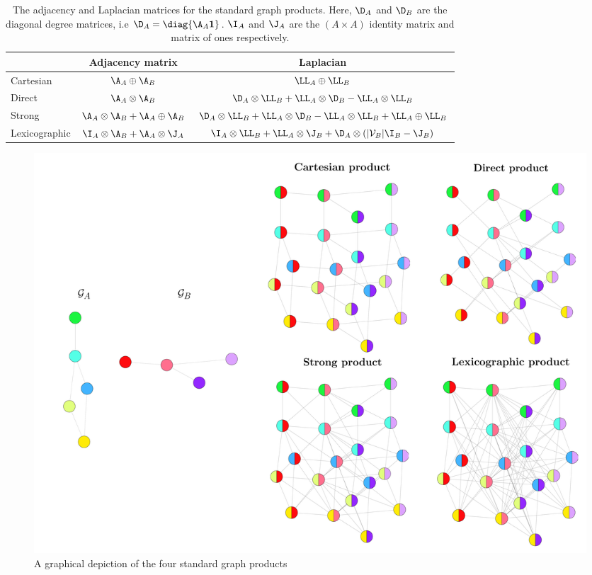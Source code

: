 \begin{table}[h]
\def\arraystretch{1.8}
\centering
\small
\vspace{0.5cm}
\begin{tabular}{|l|cc|}
    \hline 

    & Adjacency matrix
    & Laplacian \\

    \hline

    Cartesian 
    & $\A_A \oplus \A_B$ 
    & $\LL_A \oplus \LL_B$ \\

    Direct 
    & $\A_A \otimes \A_B$  
    & $\D_A \otimes \LL_B + \LL_A \otimes \D_B - \LL_A \otimes \LL_B$ \\
    
    Strong 
    & $\A_A \otimes \A_B + \A_A \oplus \A_B$ 
    & $\D_A \otimes \LL_B + \LL_A \otimes \D_B - \LL_A \otimes \LL_B + \LL_A \oplus \LL_B$ \\

    Lexicographic 
    & $\I_A \otimes \A_B + \A_A \otimes \J_A$ 
    &  $\I_A \otimes \LL_B + \LL_A \otimes \J_B + \D_A \otimes (|\mathcal{V}_B| \I_B - \J_B)$ \\

    \hline

\end{tabular}
\vspace{0.2cm}
\caption[The adjacency and Laplacian matrices for the standard graph products]{The adjacency and Laplacian matrices for the standard graph products. Here, $\D_A$ and $\D_B$ are the diagonal degree matrices, i.e $\D_A = \diag{\A_A \mathbf{1}}$. $\I_A$ and $\J_A$ are the $(A \times A)$ identity matrix and matrix of ones respectively. } 
\vspace{0.3cm}
\label{tab:grap_product_matrices}
\end{table}

\begin{figure}[t]
    \begin{center}
    \includegraphics[width=\linewidth]{Figures/product_graphs.pdf}
    \end{center}
    \caption[Graphical depiction of the standard graph products]{A graphical depiction of the four standard graph products}
    \label{fig:graph_products}
\end{figure}


